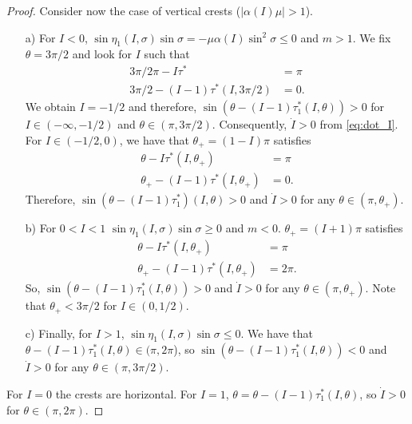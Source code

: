 \documentclass[a4paper,10pt]{article}
\newcommand{\zerom}{\text{1}}
\theoremstyle{definition}
\begin{document}
\begin{proof}
Consider now the case of vertical crests ($\left|\alpha(I)\mu\right|>1$).
\begin{itemize}
\item[a)]For $I< 0$, $\sin\eta_{\zerom}(I,\sigma)\sin\sigma = -\mu\alpha(I)\sin^2\sigma \leq 0 $ and $m>1$.
We fix $\theta = 3\pi/2$ and look for $I$ such that
\begin{align*}
3\pi/2\pi - I\tau^* &= \pi\\
3\pi/2 - (I-1)\tau^*(I,3\pi/2) &= 0.
\end{align*}
We obtain $I = -1/2$ and therefore, $\sin(\theta - (I-1)\tau^*_{\zerom}(I,\theta))> 0$ for $I\in(-\infty,-1/2)$ and $\theta \in(\pi,3\pi/2)$.
Consequently, $\dot{I} > 0$ from \eqref{eq:dot_I}.
For $I\in(-1/2 , 0)$, we have that $\theta_+ = (1-I)\pi$ satisfies
\begin{align*}
\theta - I\tau^*(I,\theta_+) & = \pi\\
\theta_+ -(I-1)\tau^*(I,\theta_+) & = 0.
\end{align*}
Therefore, $\sin(\theta - (I-1)\tau^*_{\zerom})(I,\theta) >0$ and $\dot{I}>0$ for any $\theta \in  (\pi,\theta_+)$.
\item[b)] For $ 0 < I < 1$ $\sin\eta_{\zerom}(I,\sigma)\sin\sigma \geq 0 $ and $m<0$.
$\theta_+ = (I + 1)\pi$ satisfies
\begin{align*}
\theta - I\tau^*(I,\theta_+) &= \pi\\
\theta_+ -(I-1)\tau^*(I,\theta_+)& = 2\pi.
\end{align*}
So, $\sin(\theta - (I-1)\tau^*_{\zerom}(I,\theta))>0$ and $\dot{I}>0$ for any $\theta \in(\pi,\theta_+)$.
Note that $\theta_{+} <3\pi/2$ for $I \in (0,1/2)$.
\item[c)] Finally, for $I > 1$, $\sin\eta_{\zerom}(I,\sigma) \sin\sigma \leq 0$.
We have that $\theta - (I-1)\tau^*_{\zerom}(I,\theta)\in(\pi,2\pi$), so $\sin(\theta - (I-1)\tau^*_{\zerom}(I,\theta))<0$  and $\dot{I}> 0$ for any $\theta\in(\pi,3\pi/2)$.
\end{itemize}
For $I = 0$ the crests are horizontal. For $I = 1$, $\theta = \theta - (I-1)\tau^*_{\zerom}(I,\theta)$, so $\dot{I}>0$ for $\theta \in(\pi,2\pi)$.

\end{proof}


\end{document}
